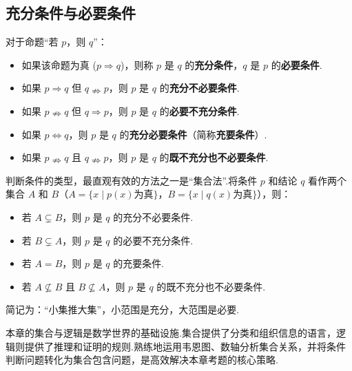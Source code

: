 	\subsection{充分条件与必要条件}
	
	\begin{definition}[充分与必要条件]
		对于命题“若 $p$，则 $q$”：
		\begin{itemize}
			\item 如果该命题为真 ($p \Rightarrow q$)，则称 $p$ 是 $q$ 的\textbf{充分条件}，$q$ 是 $p$ 的\textbf{必要条件}.
			\item 如果 $p \Rightarrow q$ 但 $q \nRightarrow p$，则 $p$ 是 $q$ 的\textbf{充分不必要条件}.
			\item 如果 $p \nRightarrow q$ 但 $q \Rightarrow p$，则 $p$ 是 $q$ 的\textbf{必要不充分条件}.
			\item 如果 $p \iff q$，则 $p$ 是 $q$ 的\textbf{充分必要条件}（简称\textbf{充要条件}）.
			\item 如果 $p \nRightarrow q$ 且 $q \nRightarrow p$，则 $p$ 是 $q$ 的\textbf{既不充分也不必要条件}.
		\end{itemize}
	\end{definition}
	
	\begin{note}[集合法]
		判断条件的类型，最直观有效的方法之一是“集合法”.将条件 $p$ 和结论 $q$ 看作两个集合 $A$ 和 $B$（$A = \{x \mid p(x) \text{为真}\}$，$B = \{x \mid q(x) \text{为真}\}$），则：
		\begin{itemize}
			\item 若 $A \subsetneq B$，则 $p$ 是 $q$ 的充分不必要条件.
			\item 若 $B \subsetneq A$，则 $p$ 是 $q$ 的必要不充分条件.
			\item 若 $A = B$，则 $p$ 是 $q$ 的充要条件.
			\item 若 $A \not\subseteq B$ 且 $B \not\subseteq A$，则 $p$ 是 $q$ 的既不充分也不必要条件.
		\end{itemize}
		简记为：“小集推大集”，小范围是充分，大范围是必要.
	\end{note}
	
	\begin{conclusion}
		本章的集合与逻辑是数学世界的基础设施.集合提供了分类和组织信息的语言，逻辑则提供了推理和证明的规则.熟练地运用韦恩图、数轴分析集合关系，并将条件判断问题转化为集合包含问题，是高效解决本章考题的核心策略.
	\end{conclusion}